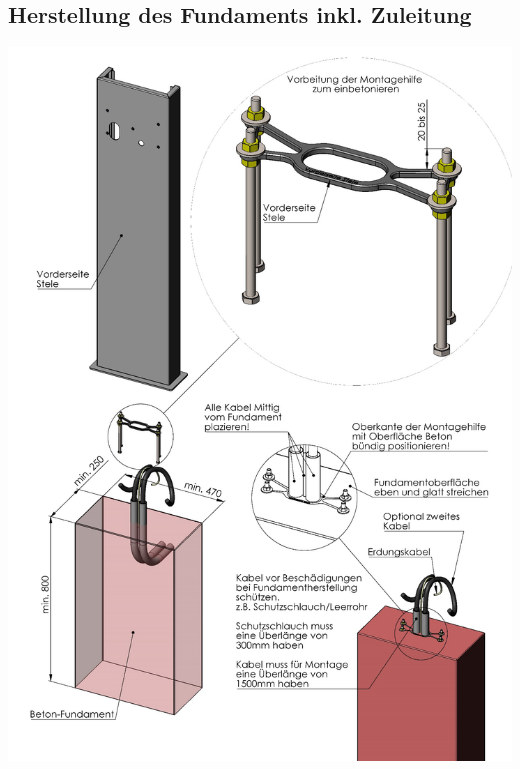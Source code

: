 \documentclass[a4paper,10pt]{article}
\begin{document}
	\subsection{Herstellung des Fundaments inkl. Zuleitung}
	\label{appendix_base}
	\begin{center}
		\includegraphics[width=0.9\linewidth]{./img/stand_overview}
	\end{center}
\end{document}
